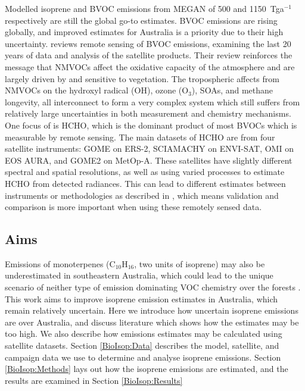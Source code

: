   Modelled isoprene and BVOC emissions from MEGAN \parencite{Guenther2000} of 500 and 1150~Tga$^{-1}$ respectively are still the global go-to estimates.
  BVOC emissions are rising globally, and improved estimates for Australia is a priority due to their high uncertainty.
  \textcite{Kefauver2014} reviews remote sensing of BVOC emissions, examining the last 20 years of data and analysis of the satellite products.
  Their review reinforces the message that NMVOCs affect the oxidative capacity of the atmosphere and are largely driven by and sensitive to vegetation.
  The tropospheric affects from NMVOCs on the hydroxyl radical (OH), ozone (O$_3$), SOAs, and methane longevity, all interconnect to form a very complex system which still suffers from relatively large uncertainties in both measurement and chemistry mechanisms.
  One focus of \textcite{Kefauver2014} is HCHO, which is the dominant product of most BVOCs which is measurable by remote sensing.
  The main datasets of HCHO are from four satellite instruments: GOME on ERS-2, SCIAMACHY on ENVI-SAT, OMI on EOS AURA, and GOME2 on MetOp-A.
  These satellites have slightly different spectral and spatial resolutions, as well as using varied processes to estimate HCHO from detected radiances.
  This can lead to different estimates between instruments or methodologies as described in \textcite{Lorent2017}, which means validation and comparison is more important when using these remotely sensed data.
  
  \subsection{Aims}
    
    Emissions of monoterpenes (C$_10$H$_16$, two units of isoprene) may also be underestimated in southeastern Australia, which could lead to the unique scenario of neither type of emission dominating VOC chemistry over the forests \parencite{Emmerson2016}.
    This work aims to improve isoprene emission estimates in Australia, which remain relatively uncertain.
    Here we introduce how uncertain isoprene emissions are over Australia, and discuss literature which shows how the estimates may be too high.
    We also describe how emissions estimates may be calculated using satellite datasets.
    Section \ref{BioIsop:Data} describes the model, satellite, and campaign data we use to determine and analyse isoprene emissions.
    Section \ref{BioIsop:Methods} lays out how the isoprene emissions are estimated, and the results are examined in Section \ref{BioIsop:Results}
  
